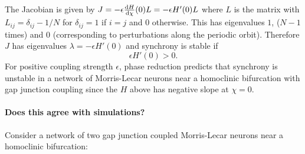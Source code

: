 \documentclass[11pt]{article}
\begin{document}
The Jacobian is given by
\(J = -\epsilon \frac{{\rm d}H}{{\rm d}\chi}(0) L = -\epsilon H'(0) L\)
where \(L\) is the matrix with \(L_{ij} =\delta_{ij}-1/N\) for
\(\delta_{ij} =1\) if \(i=j\) and \(0\) otherwise. This has eigenvalues
\(1\), (\(N-1\) times) and \(0\) (corresponding to perturbations along
the periodic orbit). Therefore \(J\) has eigenvalues
\(\lambda = -\epsilon H'(0)\) and synchrony is stable if
\[\epsilon H'(0)>0.\] For positive coupling strength \(\epsilon\), phase
reduction predicts that synchrony is unstable in a network of
Morris-Lecar neurons near a homoclinic bifurcation with gap junction
coupling since the \(H\) above has negative slope at \(\chi=0\).

\hypertarget{does-this-agree-with-simulations}{%
\paragraph{Does this agree with
simulations?}\label{does-this-agree-with-simulations}}

Consider a network of two gap junction coupled Morris-Lecar neurons near
a homoclinic bifurcation:
\end{document}
